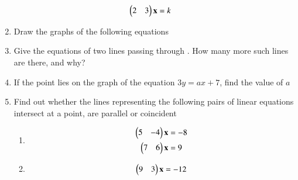 \begin{enumerate}[label=\arabic*.,ref=\thesubsection.\theenumi]
%
%
\begin{align}
\begin{pmatrix}2 & 3\end{pmatrix}\mathbf{x} &= k
\end{align}
%
%
\item Draw the graphs of the following equations
\begin{enumerate}[itemsep=2pt]
\end{enumerate}
%
\item Give the equations of two lines passing through . How many more such lines are there, and why?
\item If the point  lies on the graph of the equation $3y = ax + 7$, find the value of $a$
\item Find out whether the lines representing the
following pairs of linear equations intersect at a point, are parallel or coincident
%
\begin{enumerate}[itemsep=2pt]
\item
\begin{align}
\begin{split}
\begin{pmatrix}5 & -4 \end{pmatrix}\mathbf{x}&=-8
\\
\begin{pmatrix}7 & 6 \end{pmatrix}\mathbf{x}&=9
\end{split}
\end{align}
\item
\begin{align}
\begin{split}
\myvec{9 & 3 }\vec{x}&=-12
\\

\end{split}
\end{align}
\end{enumerate}
\end{enumerate}
